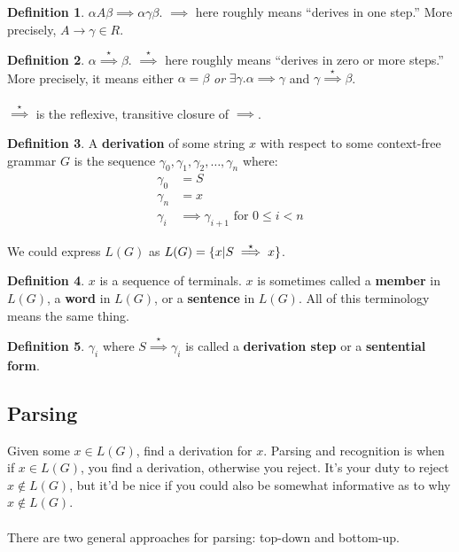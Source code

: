 \documentclass[]{article}
\DeclarePairedDelimiter{\set}{\lbrace}{\rbrace}
\theoremstyle{definition}
\newtheorem*{defn}{Definition}
\begin{document}
			\begin{defn}
				$\alpha A \beta \implies \alpha \gamma \beta$. $\implies$ here roughly means ``derives in one step.'' More precisely, $A \to \gamma \in R$.
			\end{defn}

			\begin{defn}
				$\alpha \stackrel{\star}{\implies} \beta$. $\stackrel{\star}{\implies}$ here roughly means ``derives in zero or more steps.'' More precisely, it means either $\alpha = \beta$ \emph{or} $\exists \gamma . \alpha \implies \gamma$ and $\gamma \stackrel{\star}{\implies} \beta$.
				\\ \\
				$\stackrel{\star}{\implies}$ is the reflexive, transitive closure of $\implies$.
			\end{defn}

			\begin{defn}
				A \textbf{derivation} of some string $x$ with respect to some context-free grammar $G$ is the sequence $\gamma_0, \gamma_1, \gamma_2, \ldots, \gamma_n$ where:
				\begin{align*}
					\gamma_0 &= S \\
					\gamma_n &= x \\
					\gamma_i &\implies \gamma_{i + 1} \text{ for } 0 \le i < n
				\end{align*}
			\end{defn}

			We could express $L(G)$ as $L(G) = \set{x | S \stackrel{\star}{\implies} x}$.

			\begin{defn}
				$x$ is a sequence of terminals. $x$ is sometimes called a \textbf{member} in $L(G)$, a \textbf{word} in $L(G)$, or a \textbf{sentence} in $L(G)$. All of this terminology means the same thing.
			\end{defn}

			\begin{defn}
				$\gamma_i$ where $S \stackrel{\star}{\implies} \gamma_i$ is called a \textbf{derivation step} or a \textbf{sentential form}.
			\end{defn}
			
		\subsection{Parsing}
			Given some $x \in L(G)$, find a derivation for $x$. Parsing and recognition is when if $x \in L(G)$, you find a derivation, otherwise you reject. It's your duty to reject $x \not \in L(G)$, but it'd be nice if you could also be somewhat informative as to why $x \not \in L(G)$.
			\\ \\
			There are two general approaches for parsing: top-down and bottom-up.
\end{document}
